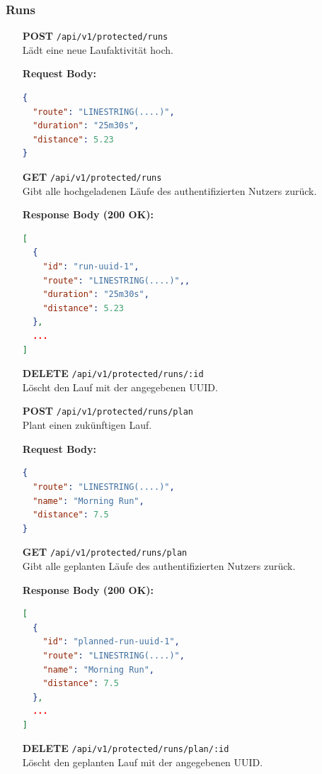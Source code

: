 \documentclass[11pt,a4paper]{article}
\begin{document}
\subsubsection{Runs}

\begin{itemize}[leftmargin=1.5cm]

  \item[\textbf{POST}] \texttt{/api/v1/protected/runs} \\
  Lädt eine neue Laufaktivität hoch.

  \textbf{Request Body:}
  \begin{lstlisting}[language=json]
{
  "route": "LINESTRING(....)",
  "duration": "25m30s",
  "distance": 5.23
}
  \end{lstlisting}

  \item[\textbf{GET}] \texttt{/api/v1/protected/runs} \\
  Gibt alle hochgeladenen Läufe des authentifizierten Nutzers zurück.

  \textbf{Response Body (200 OK):}
  \begin{lstlisting}[language=json]
[
  {
    "id": "run-uuid-1",
    "route": "LINESTRING(....)",,
    "duration": "25m30s",
    "distance": 5.23
  },
  ...
]
  \end{lstlisting}

  \item[\textbf{DELETE}] \texttt{/api/v1/protected/runs/:id} \\
  Löscht den Lauf mit der angegebenen UUID.

  \item[\textbf{POST}] \texttt{/api/v1/protected/runs/plan} \\
  Plant einen zukünftigen Lauf.

  \textbf{Request Body:}
  \begin{lstlisting}[language=json]
{
  "route": "LINESTRING(....)",
  "name": "Morning Run",
  "distance": 7.5
}
  \end{lstlisting}

  \item[\textbf{GET}] \texttt{/api/v1/protected/runs/plan} \\
  Gibt alle geplanten Läufe des authentifizierten Nutzers zurück.

  \textbf{Response Body (200 OK):}
  \begin{lstlisting}[language=json]
[
  {
    "id": "planned-run-uuid-1",
    "route": "LINESTRING(....)",
    "name": "Morning Run",
    "distance": 7.5
  },
  ...
]
  \end{lstlisting}

  \item[\textbf{DELETE}] \texttt{/api/v1/protected/runs/plan/:id} \\
  Löscht den geplanten Lauf mit der angegebenen UUID.

\end{itemize}
\end{document}
